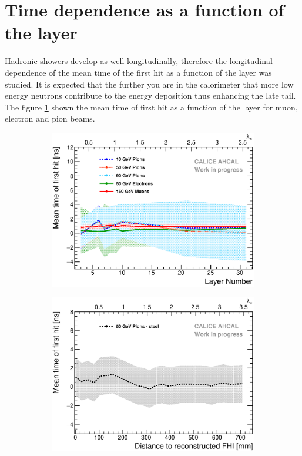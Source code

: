 \section{Time dependence as a function of the layer}

Hadronic showers develop as well longitudinally, therefore the longitudinal dependence of the mean time of the first hit as a function of the layer was studied. It is expected that the further you are in the calorimeter that more low energy neutrons contribute to the energy deposition thus enhancing the late tail. The figure \ref{fig:Depth_Comparison} shown the mean time of first hit as a function of the layer for muon, electron and pion beams.

\begin{figure}[htbp!]
	\begin{subfigure}[t]{0.49\textwidth}
		\centering
		\includegraphics[width=1\textwidth]{../Thesis_Plots/Timing/Pions/Plots/Timing_Depth_Comparison_ShortAsymRange.eps}
		\caption{} \label{fig:Depth_Comparison}
	\end{subfigure}
	\hfill
	\begin{subfigure}[t]{0.49\textwidth}
		\centering
		\includegraphics[width=1\textwidth]{../Thesis_Plots/Timing/Pions/Plots/Timing_Depth_Comparison_ShortAsymRange_ShowerStart.eps}

\end{subfigure}
\end{figure}
